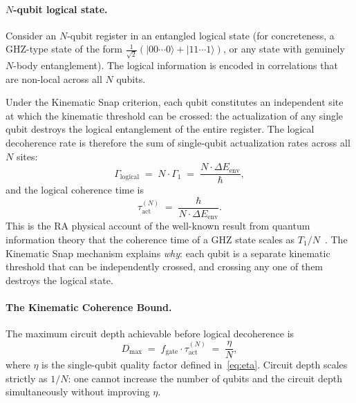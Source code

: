 \documentclass[11pt,a4paper]{article}
\theoremstyle{plain}
\theoremstyle{definition}
\theoremstyle{remark}
\newcommand{\ket}[1]{|#1\rangle}
\begin{document}
\paragraph{$N$-qubit logical state.}
Consider an $N$-qubit register in an entangled logical state (for concreteness, a
GHZ-type state of the form $\frac{1}{\sqrt{2}}(\ket{00\cdots0} +
\ket{11\cdots1})$, or any state with genuinely $N$-body entanglement). The logical
information is encoded in correlations that are non-local across all $N$ qubits.

Under the Kinematic Snap criterion, each qubit constitutes an independent site at
which the kinematic threshold can be crossed: the actualization of any single qubit
destroys the logical entanglement of the entire register. The logical decoherence rate is therefore the sum of single-qubit actualization
rates across all $N$ sites:
\begin{equation}
  \Gamma_{\mathrm{logical}} \;=\; N \cdot \Gamma_1 \;=\; \frac{N \cdot \Delta E_{\mathrm{env}}}{\hbar},
  \label{eq:gamma_N}
\end{equation}
and the logical coherence time is
\begin{equation}
  \tau_{\mathrm{act}}^{(N)} \;=\; \frac{\hbar}{N \cdot \Delta E_{\mathrm{env}}}.
  \label{eq:tauN}
\end{equation}
This is the RA physical account of the well-known result from quantum information
theory that the coherence time of a GHZ state scales as $T_1/N$~\citep{Huelga1997}.
The Kinematic Snap mechanism explains \emph{why}: each qubit is a separate kinematic
threshold that can be independently crossed, and crossing any one of them destroys
the logical state.

\paragraph{The Kinematic Coherence Bound.}
The maximum circuit depth achievable before logical decoherence is
\begin{equation}
  \boxed{D_{\max} \;=\; f_{\mathrm{gate}} \cdot \tau_{\mathrm{act}}^{(N)}
                   \;=\; \frac{\eta}{N},}
  \label{eq:kcb}
\end{equation}
where $\eta$ is the single-qubit quality factor defined in~\eqref{eq:eta}. Circuit
depth scales strictly as $1/N$: one cannot increase the number of qubits and the
circuit depth simultaneously without improving $\eta$.
\end{document}
